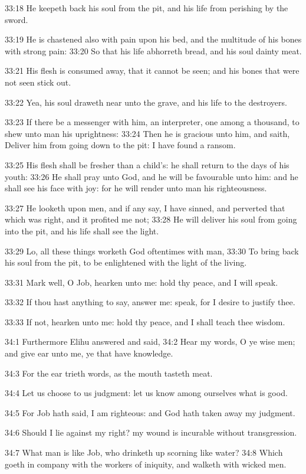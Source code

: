 33:18 He keepeth back his soul from the pit, and his life from perishing by the sword.

33:19 He is chastened also with pain upon his bed, and the multitude of his bones with strong pain: 33:20 So that his life abhorreth bread, and his soul dainty meat.

33:21 His flesh is consumed away, that it cannot be seen; and his bones that were not seen stick out.

33:22 Yea, his soul draweth near unto the grave, and his life to the destroyers.

33:23 If there be a messenger with him, an interpreter, one among a thousand, to shew unto man his uprightness: 33:24 Then he is gracious unto him, and saith, Deliver him from going down to the pit: I have found a ransom.

33:25 His flesh shall be fresher than a child's: he shall return to the days of his youth: 33:26 He shall pray unto God, and he will be favourable unto him: and he shall see his face with joy: for he will render unto man his righteousness.

33:27 He looketh upon men, and if any say, I have sinned, and perverted that which was right, and it profited me not; 33:28 He will deliver his soul from going into the pit, and his life shall see the light.

33:29 Lo, all these things worketh God oftentimes with man, 33:30 To bring back his soul from the pit, to be enlightened with the light of the living.

33:31 Mark well, O Job, hearken unto me: hold thy peace, and I will speak.

33:32 If thou hast anything to say, answer me: speak, for I desire to justify thee.

33:33 If not, hearken unto me: hold thy peace, and I shall teach thee wisdom.

34:1 Furthermore Elihu answered and said, 34:2 Hear my words, O ye wise men; and give ear unto me, ye that have knowledge.

34:3 For the ear trieth words, as the mouth tasteth meat.

34:4 Let us choose to us judgment: let us know among ourselves what is good.

34:5 For Job hath said, I am righteous: and God hath taken away my judgment.

34:6 Should I lie against my right? my wound is incurable without transgression.

34:7 What man is like Job, who drinketh up scorning like water?  34:8 Which goeth in company with the workers of iniquity, and walketh with wicked men.

